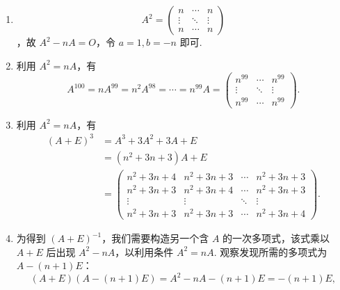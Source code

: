 \documentclass[UTF8,12pt,a4paper,fontset=fandol]{ctexart}
\begin{document}
\begin{solve}
\begin{enumerate}
                \item 
\[A^2 = \begin{pmatrix}
                        n      & \cdots & n      \\
                        \vdots & \ddots & \vdots \\
                        n      & \cdots & n
                    \end{pmatrix}\]
，故 $A^2 - nA = O$，令 $a=1, b=-n$ 即可.

                \item 利用 $A^2 = nA$，有
                    \[
                        A^{100} = n A^{99} = n^2 A^{98} = \cdots = n^{99} A = \begin{pmatrix}
                            n^{99} & \cdots & n^{99} \\
                            \vdots & \ddots & \vdots \\
                            n^{99} & \cdots & n^{99}
                        \end{pmatrix}.
                    \]

                \item 利用 $A^2 = nA$，有
                    \begin{align*}
                        (A+E)^3 &= A^3 + 3A^2 + 3A + E \\
                                &= (n^2 + 3n + 3)A + E \\
                                &= \begin{pmatrix}
                                    n^2 + 3n + 4 & n^2 + 3n + 3 & \cdots & n^2 + 3n + 3 \\
                                    n^2 + 3n + 3 & n^2 + 3n + 4 & \cdots & n^2 + 3n + 3 \\
                                    \vdots & \vdots & \ddots & \vdots \\
                                    n^2 + 3n + 3 & n^2 + 3n + 3 & \cdots & n^2 + 3n + 4
                                \end{pmatrix}.
                    \end{align*}

                \item 为得到 $(A+E)^{-1}$，我们需要构造另一个含 $A$ 的一次多项式，该式乘以 $A+E$ 后出现 $A^2 - nA$，以利用条件 $A^2 = nA$. 观察发现所需的多项式为 $A - (n+1)E$：
                    \[
                        (A+E)(A-(n+1)E) = A^2 - nA -(n+1)E = -(n+1)E,
                    \]


\end{enumerate}
\end{solve}
\end{document}
